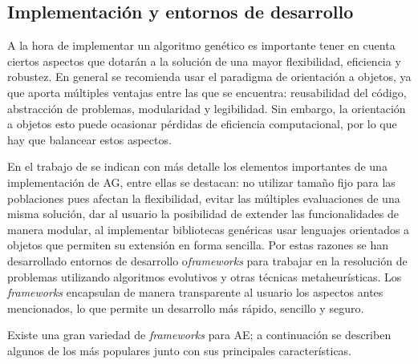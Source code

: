 \subsection{Implementación y entornos de desarrollo}

A la hora de implementar un algoritmo genético es importante tener en cuenta ciertos aspectos que dotarán a la solución de una mayor flexibilidad, eficiencia y robustez. En general se recomienda usar el paradigma de orientación a objetos, ya que aporta múltiples ventajas entre las que se encuentra: reusabilidad del código, abstracción de problemas, modularidad y legibilidad. Sin embargo, la orientación a objetos esto puede ocasionar pérdidas de eficiencia computacional, por lo que hay que balancear estos aspectos.

En el trabajo de \citet{Alba1997} se indican con más detalle los elementos importantes de una implementación de AG, entre ellas se destacan: no utilizar tamaño fijo para las poblaciones pues afectan la flexibilidad, evitar las múltiples evaluaciones de una misma solución, dar al usuario la posibilidad de extender las funcionalidades de manera modular, al implementar bibliotecas genéricas usar lenguajes orientados a objetos que permiten su extensión en forma sencilla. Por estas razones se han desarrollado entornos de desarrollo o\emph{frameworks} para trabajar en la resolución de problemas utilizando algoritmos evolutivos y otras técnicas metaheurísticas. Los \emph{frameworks} encapsulan de manera transparente al usuario los aspectos antes mencionados, lo que permite un desarrollo más rápido, sencillo y seguro.

Existe una gran variedad de \emph{frameworks} para AE; a continuación se describen algunos de los más populares junto con sus principales características.

